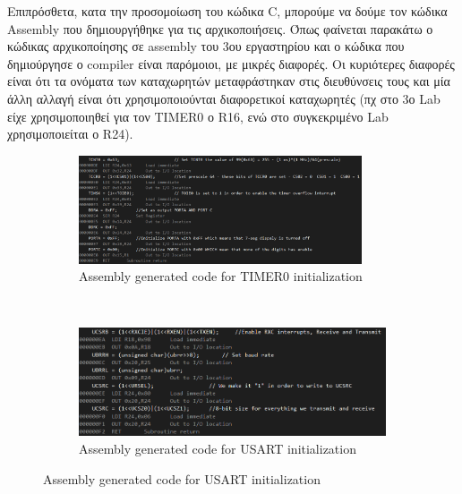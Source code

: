 \documentclass{article}
\begin{document}
\pagebreak
\noindent
	Επιπρόσθετα, κατα την προσομοίωση του κώδικα C, μπορούμε να δούμε τον κώδικα Assembly που δημιουργήθηκε για τις αρχικοποιήσεις. Όπως φαίνεται παρακάτω ο κώδικας αρχικοποίησης σε assembly του 3ου εργαστηρίου και ο κώδικα που δημιούργησε ο compiler είναι παρόμοιοι, με μικρές διαφορές. Οι κυριότερες διαφορές είναι ότι τα ονόματα των καταχωρητών μεταφράστηκαν στις διευθύνσεις τους και μία άλλη αλλαγή είναι ότι χρησιμοποιούνται διαφορετικοί καταχωρητές (πχ στο 3ο Lab είχε χρησιμοποιηθεί για τον TIMER0 ο R16, ενώ στο συγκεκριμένο Lab χρησιμοποιείται ο R24).
	
	\begin{figure}[h!]
		\centering
		\begin{subfigure}[t]{0.5\textwidth}
			\centering
			\includegraphics[height=3.2cm, width=\linewidth]{./results/lab4_c_to_assembly_timer0_init.png}
			\caption{Assembly generated code for TIMER0 initialization}
		\end{subfigure}%
		~
		\begin{subfigure}[t]{0.5\textwidth}
			\centering
			\includegraphics[height=3.2cm, width=\linewidth]{./results/lab4_c_to_assembly_usart_init.png}
			\caption{Assembly generated code for USART initialization}
		\end{subfigure}
	\end{figure}
\end{document}
